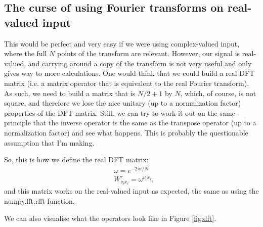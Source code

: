 \documentclass{article}
\begin{document}
\subsection{The curse of using Fourier transforms on real-valued input}

This would be perfect and very easy if we were using complex-valued input, where the full $N$ points of the transform are relevant.
However, our signal is real-valued, and carrying around a copy of the transform is not very useful and only gives way to more calculations.
One would think that we could build a real DFT matrix (i.e. a matrix operator that is equivalent to the real Fourier transform).
As such, we need to build a matrix that is $N/2+1$ by $N$, which, of course, is not square, and therefore we lose the nice unitary (up to a normalization factor) properties of the DFT matrix.
Still, we can try to work it out on the same principle that the inverse operator is the same as the transpose operator (up to a normalization factor) and see what happens.
This is probably the questionable assumption that I'm making.

So, this is how we define the real DFT matrix:
\begin{align}
	&\omega = e^{-2\pi i / N}\\
	&W^r_{\nu_i x_i} = \omega^{\nu_i x_i},
\end{align}
and this matrix works on the real-valued input as expected, the same as using the numpy.fft.rfft function.

We can also visualise what the operators look like in Figure \ref{fig:dft}.
\end{document}
